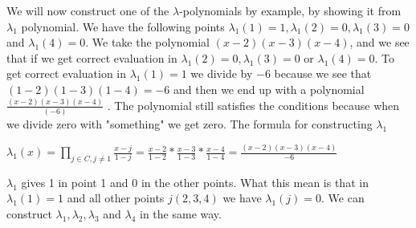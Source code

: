 \noindent
We will now construct one of the \begin{math}\lambda\end{math}-polynomials by example, by showing it from \begin{math}\lambda_1\end{math} polynomial. 
We have the following points \begin{math}\lambda_1(1)=1, \lambda_1(2)=0, \lambda_1(3)=0 \end{math} and \begin{math} \lambda_1 (4)=0\end{math}. We take the polynomial \begin{math} (x-2)(x-3)(x-4)\end{math}, and we see that if we get correct evaluation in \begin{math}\lambda_1 (2)=0, \lambda_1 (3)=0\end{math} or \begin{math} \lambda_1 (4)=0\end{math}. To get correct evaluation in  \begin{math} \lambda_1 (1)=1\end{math} we divide by \begin{math}-6\end{math} because we see that \begin{math}(1-2)(1-3)(1-4)=-6\end{math} and then we end up with a polynomial \begin{math}\frac{(x-2)(x-3)(x-4)}{(-6)}\end{math} .  The polynomial still satisfies the conditions because when we divide zero with "something" we get zero.  The formula for constructing \begin{math}\lambda_1\end{math} 

\begin{center}
\begin{math} \lambda_1(x)=\prod\limits_{j\in C,j\neq1} \frac{x-j}{1-j} = \frac{x-2}{1-2}*\frac{x-3}{1-3}*\frac{x-4}{1-4}=\frac{(x-2)(x-3)(x-4)}{-6} \end{math}\\
\end{center}

\noindent
\begin{math} \lambda_1\end{math} gives 1 in point 1 and 0 in the other points. What this mean is that in \begin{math} \lambda_1(1)=1\end{math} and all other points  \begin{math}j (2,3,4)\end{math} we have \begin{math} \lambda_1 (j)=0\end{math}. We can construct \begin{math}\lambda_1, \lambda_2, \lambda_3\end{math} and  \begin{math}\lambda_4\end{math} in the same way.

